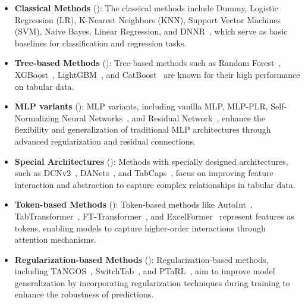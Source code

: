 \begin{itemize}
    \item \textbf{Classical Methods} (): The classical methods include Dummy, Logistic Regression (LR), K-Nearest Neighbors (KNN), Support Vector Machines (SVM), Naive Bayes, Linear Regression, and DNNR~\citep{NaderSL22DNNR}, which serve as basic baselines for classification and regression tasks.
    
    \item \textbf{Tree-based Methods} (): Tree-based methods such as Random Forest~\citep{Breiman01RandomForest}, XGBoost~\citep{chen2016xgboost}, LightGBM~\citep{ke2017lightgbm}, and CatBoost~\citep{Prokhorenkova2018Catboost} are known for their high performance on tabular data.
    
    \item \textbf{MLP variants} (): MLP variants, including vanilla MLP, MLP-PLR, Self-Normalizing Neural Networks~\citep{KlambauerUMH17Self}, and Residual Network~\citep{GorishniyRKB21Revisiting}, enhance the flexibility and generalization of traditional MLP architectures through advanced regularization and residual connections.
    
    \item \textbf{Special Architectures} (): Methods with specially designed architectures, such as DCNv2~\citep{WangSCJLHC21DCNv2}, DANets~\citep{ChenLWCW22DAN}, and TabCaps~\citep{Chen2023TabCaps}, focus on improving feature interaction and abstraction to capture complex relationships in tabular data.
    
    \item \textbf{Token-based Methods} (): Token-based methods like AutoInt~\citep{SongS0DX0T19AutoInt}, TabTransformer~\citep{Huang2020TabTransformer}, FT-Transformer~\citep{GorishniyRKB21Revisiting}, and ExcelFormer~\citep{Chen2023Excel} represent features as tokens, enabling models to capture higher-order interactions through attention mechanisms.
    
    \item \textbf{Regularization-based Methods} (): Regularization-based methods, including TANGOS~\citep{jeffares2023tangos}, SwitchTab~\citep{Wu2024SwitchTab}, and PTaRL~\citep{PTARL}, aim to improve model generalization by incorporating regularization techniques during training to enhance the robustness of predictions.
    

\end{itemize}
